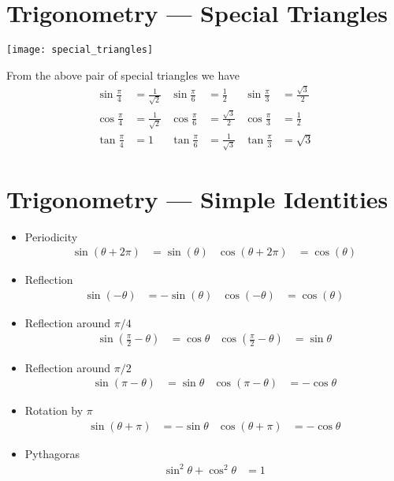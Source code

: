\section{Trigonometry --- Special Triangles}
\begin{center}
  \texttt{[image: special\_triangles]}
\end{center}
From the above pair of special triangles we have
\begin{align*}
  \sin \frac{\pi}{4} &= \frac{1}{\sqrt{2}} &  \sin \frac{\pi}{6} &= \frac{1}{2} & \sin \frac{\pi}{3} &= \frac{\sqrt{3}}{2} \\
  \cos \frac{\pi}{4} &= \frac{1}{\sqrt{2}} &  \cos \frac{\pi}{6} &= \frac{\sqrt{3}}{2} & \cos \frac{\pi}{3} &= \frac{1}{2} \\
  \tan \frac{\pi}{4} &= 1 &  \tan \frac{\pi}{6} &= \frac{1}{\sqrt{3}} & \tan
\frac{\pi}{3} &= \sqrt{3}
\end{align*}

\section{Trigonometry --- Simple Identities}
\begin{itemize}
 \item Periodicity
\begin{align*}
  \sin(\theta+2\pi) &= \sin(\theta) &
  \cos(\theta+2\pi) &= \cos(\theta)
\end{align*}
\item Reflection
\begin{align*}
  \sin(-\theta)&=-\sin(\theta) & \cos(-\theta) &=\cos(\theta)
\end{align*}
\item Reflection around $\pi/4$
\begin{align*}
\sin\left(\tfrac{\pi}{2}-\theta\right)&=\cos\theta &
\cos\left(\tfrac{\pi}{2}-\theta\right)&=\sin\theta
\end{align*}
\item Reflection around $\pi/2$
\begin{align*}
\sin\left(\pi-\theta\right)&=\sin\theta &
\cos\left(\pi-\theta\right)&=-\cos\theta
\end{align*}
\item Rotation by $\pi$
\begin{align*}
\sin\left(\theta+\pi\right)&=-\sin\theta &
\cos\left(\theta+\pi\right)&=-\cos\theta
\end{align*}
\item Pythagoras
\begin{align*}
\sin^2\theta + \cos^2 \theta &=1
\end{align*}

\end{itemize}

